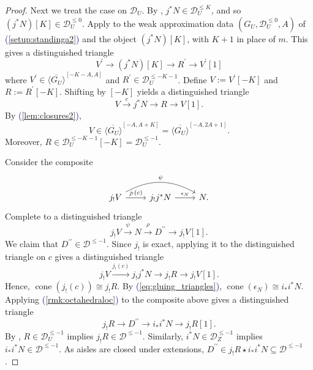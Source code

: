 \documentclass[11pt]{amsart}
\def\eqref#1{\textcolor{darkblue}{(\ref{#1})}}
\theoremstyle{plain}
\theoremstyle{definition}
\numberwithin{equation}{section}
\numberwithin{theorem}{section}
\begin{document}
\begin{proof}
    Next we treat the case on $\mathcal{D}_U$.
    By , $j^\ast N\in \mathcal{D}_U^{\leq K}$, and so $(j^\ast N)[K]\in \mathcal{D}_U^{\leq 0}$.
    Apply  to the weak approximation data $(G_U,\mathcal{D}_U^{\leq 0},A)$ of \eqref{setup:standinga2} and the object $(j^\ast N)[K]$, with $K+1$ in place of $m$.
    This gives a distinguished triangle
    \begin{displaymath}
        V^\prime\to (j^\ast N)[K]\to R^\prime\to V^\prime[1]
    \end{displaymath}
    where $V^\prime\in \overline{\langle G_U\rangle}^{[-K-A,A]}$ and $R^\prime\in \mathcal{D}_U^{\leq -K-1}$.
    Define $V := V^\prime[-K]$ and $R := R^\prime[-K]$.
    Shifting by $[-K]$ yields a distinguished triangle
    \begin{displaymath}
        V\xrightarrow{c} j^\ast N\to R\to V[1].
    \end{displaymath}
    By \eqref{lem:closures2},
    \begin{displaymath}
        V\in \overline{\langle G_U\rangle}^{[-A,A+K]} = \overline{\langle G_U\rangle}^{[-A,2A+1]}.
    \end{displaymath}
    Moreover, $R\in \mathcal{D}_U^{\leq -K-1}[-K] = \mathcal{D}_U^{\leq -1}$.

    Consider the composite
    \begin{displaymath}
        \begin{tikzcd}
            j_! V \ar[r, "j_!(c)"] \ar[rr, bend left=30, "\psi"] & j_! j^\ast N \ar[r, "\epsilon_N"] & N.
        \end{tikzcd}
    \end{displaymath}
    Complete to a distinguished triangle
    \begin{displaymath}
        j_! V\xrightarrow{\psi} N \xrightarrow{\rho} D^{\prime\prime}\to j_! V[1].
    \end{displaymath}
    We claim that $D^{\prime\prime}\in \mathcal{D}^{\leq -1}$.
    Since $j_!$ is exact, applying it to the distinguished triangle on $c$ gives a distinguished triangle
    \begin{displaymath}
        j_! V\xrightarrow{j_!(c)} j_! j^\ast N\to j_! R\to j_! V[1].
    \end{displaymath}
    Hence, $\operatorname{cone}(j_!(c)) \cong j_! R$.
    By \eqref{eq:gluing_triangles}, $\operatorname{cone}(\epsilon_N)\cong i_\ast i^\ast N$.
    Applying \eqref{rmk:octahedraloc} to the composite above gives a distinguished triangle
    \begin{displaymath}
        j_! R\to D^{\prime\prime}\to i_\ast i^\ast N\to j_! R[1].
    \end{displaymath}
    By , $R\in \mathcal{D}_U^{\leq -1}$ implies $j_! R\in \mathcal{D}^{\leq -1}$.
    Similarly, $i^\ast N\in \mathcal{D}_Z^{\leq -1}$ implies $i_\ast i^\ast N \in \mathcal{D}^{\leq -1}$.
    As aisles are closed under extensions, $D^{\prime\prime}\in j_! R\star i_\ast i^\ast N \subseteq \mathcal{D}^{\leq -1}$.


\end{proof}
\end{document}
